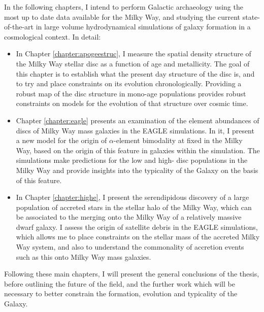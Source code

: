 In the following chapters, I intend to perform Galactic archaeology using the most up to date data available for the Milky Way, and studying the current state-of-the-art in large volume hydrodynamical simulations of galaxy formation in a cosmological context. In detail:
\begin{itemize}
    \item In Chapter \ref{chapter:apogeestruc}, I measure the spatial density structure of the Milky Way stellar disc as a function of age and metallicity. The goal of this chapter is to establish what the present day structure of the disc is, and to try and place constraints on its evolution chronologically. Providing a robust map of the disc structure in mono-age populations provides robust constraints on models for the evolution of that structure over cosmic time.
    \item Chapter \ref{chapter:eagle} presents an examination of the element abundances of discs of Milky Way mass galaxies in the EAGLE simulations. In it, I present a new model for the origin of $\alpha$-element bimodality at fixed \feh{} in the Milky Way, based on the origin of this feature in galaxies within the simulation. The simulations make predictions for the low and high-\afe{} disc populations in the Milky Way and provide insights into the typicality of the Galaxy on the basis of this feature.
    \item In Chapter \ref{chapter:highe}, I present the serendipidous discovery of a large population of accreted stars in the stellar halo of the Milky Way, which can be associated to the merging onto the Milky Way of a relatively massive dwarf galaxy. I assess the origin of satellite debris in the EAGLE simulations, which allows me to place constraints on the stellar mass of the accreted Milky Way system, and also to understand the commonality of accretion events such as this onto Milky Way mass galaxies.
\end{itemize}
Following these main chapters, I will present the general conclusions of the thesis, before outlining the future of the field, and the further work which will be necessary to better constrain the formation, evolution and typicality of the Galaxy.




